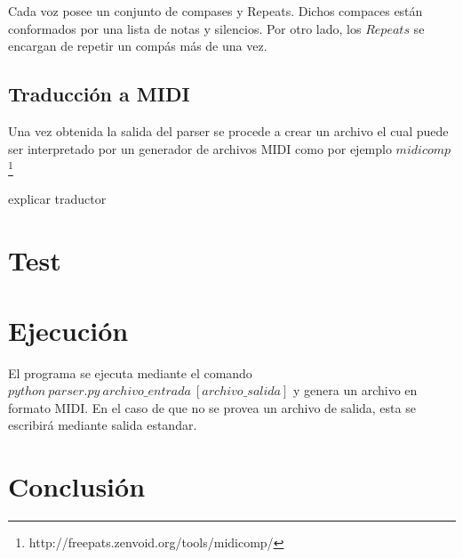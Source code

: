 \documentclass[a4paper, 10pt, twoside]{article}
\begin{document}
Cada voz posee un conjunto de compases y Repeats. Dichos compaces están conformados por una lista de notas y silencios. Por otro lado, los $Repeats$ se encargan de repetir un compás más de una vez.

\subsection{Traducción a MIDI}
Una vez obtenida la salida del parser se procede a crear un archivo el cual puede ser interpretado por un generador de archivos MIDI como por ejemplo $midicomp$ \footnote{http://freepats.zenvoid.org/tools/midicomp/}

explicar traductor

\newpage


\section{Test}

\newpage


\section{Ejecución}
El programa se ejecuta mediante el comando $python\ parser.py\ archivo\_entrada\ [archivo\_salida]$ y genera un archivo en formato MIDI. En el caso de que no se provea un archivo de salida, esta se escribirá mediante salida estandar. 
\newpage


\section{Conclusión}
\end{document}
